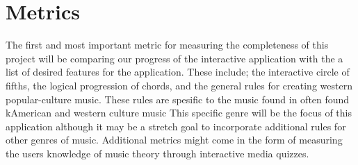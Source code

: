 \documentclass[onecolumn, draftclsnofoot,10pt, compsoc]{IEEEtran}
\begin{document}
\section {Metrics}
	The first and most important metric for measuring the completeness of this project will be comparing our progress of the interactive application with the a list of desired features for the application. These include; the interactive circle of fifths, the logical progression of chords, and the general rules for creating western popular-culture music. These rules are spesific to the music found in often found kAmerican and western culture music This specific genre will be the focus of this application although it may be a stretch goal to incorporate additional rules for other genres of music. Additional metrics might come in the form of measuring the users knowledge of music theory through interactive media quizzes. 
\end{document}
